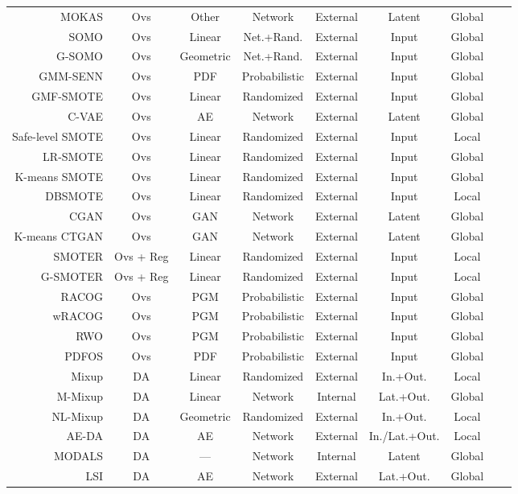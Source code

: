\begin{longtable}{rcccccccc}
    MOKAS & Ovs & Other & Network & External & Latent & Global \\
    SOMO & Ovs & Linear & Net.+Rand. & External & Input & Global \\
    G-SOMO & Ovs & Geometric & Net.+Rand. & External & Input & Global \\
    GMM-SENN & Ovs & PDF & Probabilistic & External & Input & Global \\
    GMF-SMOTE & Ovs & Linear & Randomized & External & Input & Global \\
    C-VAE & Ovs & AE & Network & External & Latent & Global \\
    Safe-level SMOTE & Ovs & Linear & Randomized & External & Input & Local \\
    LR-SMOTE & Ovs & Linear & Randomized & External & Input & Global \\
    K-means SMOTE & Ovs & Linear & Randomized & External & Input & Global\\
    DBSMOTE & Ovs & Linear & Randomized & External & Input & Local\\
    CGAN & Ovs & GAN & Network & External & Latent & Global \\
    K-means CTGAN & Ovs & GAN & Network & External & Latent & Global \\
    SMOTER & Ovs + Reg & Linear & Randomized & External & Input & Local \\
    G-SMOTER & Ovs + Reg & Linear & Randomized & External & Input & Local \\
    RACOG & Ovs & PGM & Probabilistic & External & Input & Global \\
    wRACOG & Ovs & PGM & Probabilistic & External & Input & Global \\
    RWO & Ovs & PGM & Probabilistic & External & Input & Global \\
    PDFOS & Ovs & PDF & Probabilistic & External & Input & Global \\
    Mixup & DA & Linear & Randomized & External & In.+Out. & Local \\
    M-Mixup & DA & Linear & Network & Internal & Lat.+Out. & Global \\
    NL-Mixup & DA & Geometric & Randomized & External & In.+Out. & Local \\
    AE-DA & DA & AE & Network & External & In./Lat.+Out. & Local \\
    MODALS & DA & --- & Network & Internal & Latent & Global \\
    LSI & DA & AE & Network & External & Lat.+Out. & Global \\

\end{longtable}
